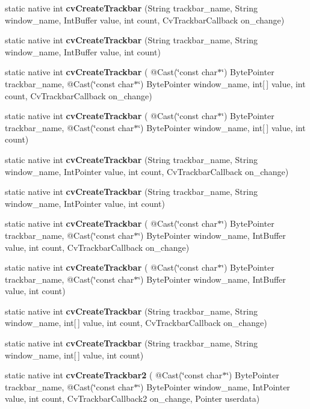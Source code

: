 \begin{DoxyCompactItemize}
\item 
static native int {\bfseries cv\+Create\+Trackbar} (String trackbar\+\_\+name, String window\+\_\+name, Int\+Buffer value, int count, Cv\+Trackbar\+Callback on\+\_\+change)
\item 
static native int {\bfseries cv\+Create\+Trackbar} (String trackbar\+\_\+name, String window\+\_\+name, Int\+Buffer value, int count)
\item 
static native int {\bfseries cv\+Create\+Trackbar} ( @Cast(\char`\"{}const char$\ast$\char`\"{}) Byte\+Pointer trackbar\+\_\+name, @Cast(\char`\"{}const char$\ast$\char`\"{}) Byte\+Pointer window\+\_\+name, int\mbox{[}$\,$\mbox{]} value, int count, Cv\+Trackbar\+Callback on\+\_\+change)
\item 
static native int {\bfseries cv\+Create\+Trackbar} ( @Cast(\char`\"{}const char$\ast$\char`\"{}) Byte\+Pointer trackbar\+\_\+name, @Cast(\char`\"{}const char$\ast$\char`\"{}) Byte\+Pointer window\+\_\+name, int\mbox{[}$\,$\mbox{]} value, int count)
\item 
static native int {\bfseries cv\+Create\+Trackbar} (String trackbar\+\_\+name, String window\+\_\+name, Int\+Pointer value, int count, Cv\+Trackbar\+Callback on\+\_\+change)
\item 
static native int {\bfseries cv\+Create\+Trackbar} (String trackbar\+\_\+name, String window\+\_\+name, Int\+Pointer value, int count)
\item 
static native int {\bfseries cv\+Create\+Trackbar} ( @Cast(\char`\"{}const char$\ast$\char`\"{}) Byte\+Pointer trackbar\+\_\+name, @Cast(\char`\"{}const char$\ast$\char`\"{}) Byte\+Pointer window\+\_\+name, Int\+Buffer value, int count, Cv\+Trackbar\+Callback on\+\_\+change)
\item 
static native int {\bfseries cv\+Create\+Trackbar} ( @Cast(\char`\"{}const char$\ast$\char`\"{}) Byte\+Pointer trackbar\+\_\+name, @Cast(\char`\"{}const char$\ast$\char`\"{}) Byte\+Pointer window\+\_\+name, Int\+Buffer value, int count)
\item 
static native int {\bfseries cv\+Create\+Trackbar} (String trackbar\+\_\+name, String window\+\_\+name, int\mbox{[}$\,$\mbox{]} value, int count, Cv\+Trackbar\+Callback on\+\_\+change)
\item 
static native int {\bfseries cv\+Create\+Trackbar} (String trackbar\+\_\+name, String window\+\_\+name, int\mbox{[}$\,$\mbox{]} value, int count)
\item 
static native int {\bfseries cv\+Create\+Trackbar2} ( @Cast(\char`\"{}const char$\ast$\char`\"{}) Byte\+Pointer trackbar\+\_\+name, @Cast(\char`\"{}const char$\ast$\char`\"{}) Byte\+Pointer window\+\_\+name, Int\+Pointer value, int count, Cv\+Trackbar\+Callback2 on\+\_\+change, Pointer userdata)

\end{DoxyCompactItemize}
